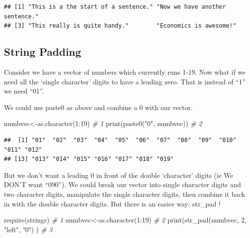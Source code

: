 \documentclass[
]{book}
\newenvironment{Shaded}{\begin{snugshade}}{\end{snugshade}}
\newcommand{\CommentTok}[1]{\textcolor[rgb]{0.56,0.35,0.01}{\textit{#1}}}
\newcommand{\DecValTok}[1]{\textcolor[rgb]{0.00,0.00,0.81}{#1}}
\newcommand{\FunctionTok}[1]{\textcolor[rgb]{0.00,0.00,0.00}{#1}}
\newcommand{\NormalTok}[1]{#1}
\newcommand{\OtherTok}[1]{\textcolor[rgb]{0.56,0.35,0.01}{#1}}
\newcommand{\SpecialCharTok}[1]{\textcolor[rgb]{0.00,0.00,0.00}{#1}}
\newcommand{\StringTok}[1]{\textcolor[rgb]{0.31,0.60,0.02}{#1}}
\begin{document}
\begin{verbatim}
## [1] "This is a the start of a sentence." "Now we have another sentence."     
## [3] "This really is quite handy."        "Economics is awesome!"
\end{verbatim}

\hypertarget{string-padding}{%
\subsection{String Padding}\label{string-padding}}

Consider we have a vector of numbers which currently runs 1-19. Now what if we need all the `single character' digits to have a leading zero. That is instead of ``1'' we need ``01''.

We could use paste0 as above and combine a 0 with our vector.

\begin{Shaded}
\begin{Highlighting}[]
\NormalTok{numbvec}\OtherTok{\textless{}{-}}\FunctionTok{as.character}\NormalTok{(}\DecValTok{1}\SpecialCharTok{:}\DecValTok{19}\NormalTok{)  }\CommentTok{\# 1}
\FunctionTok{print}\NormalTok{(}\FunctionTok{paste0}\NormalTok{(}\StringTok{"0"}\NormalTok{, numbvec))  }\CommentTok{\# 2}
\end{Highlighting}
\end{Shaded}

\begin{verbatim}
##  [1] "01"  "02"  "03"  "04"  "05"  "06"  "07"  "08"  "09"  "010" "011" "012"
## [13] "013" "014" "015" "016" "017" "018" "019"
\end{verbatim}

But we don't want a leading 0 in front of the double `character' digits (ie We DON'T want ``090''). We could break our vector into single character digits and two character digits, manipulate the single character digits, then combine it back in with the double character digits. But there is an easier way: str\_pad !

\begin{Shaded}
\begin{Highlighting}[]
\FunctionTok{require}\NormalTok{(stringr)                           }\CommentTok{\# 1}
\NormalTok{numbvec}\OtherTok{\textless{}{-}}\FunctionTok{as.character}\NormalTok{(}\DecValTok{1}\SpecialCharTok{:}\DecValTok{19}\NormalTok{)                }\CommentTok{\# 2}
\FunctionTok{print}\NormalTok{(}\FunctionTok{str\_pad}\NormalTok{(numbvec, }\DecValTok{2}\NormalTok{, }\StringTok{"left"}\NormalTok{, }\StringTok{"0"}\NormalTok{)  )  }\CommentTok{\# 3}
\end{Highlighting}
\end{Shaded}
\end{document}

